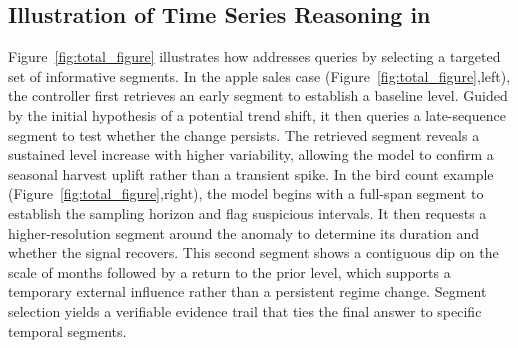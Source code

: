 

\subsection{Illustration of Time Series Reasoning in \algoname}
Figure~\ref{fig:total_figure} illustrates how \algoname addresses queries by selecting a targeted set of informative segments. 
In the apple sales case (Figure~\ref{fig:total_figure},left), the controller first retrieves an early segment to establish a baseline level. Guided by the initial hypothesis of a potential trend shift, it then queries a late-sequence segment to test whether the change persists. The retrieved segment reveals a sustained level increase with higher variability, allowing the model to confirm a seasonal harvest uplift rather than a transient spike. 
In the bird count example (Figure~\ref{fig:total_figure},right), the model begins with a full-span segment to establish the sampling horizon and flag suspicious intervals. It then requests a higher-resolution segment around the anomaly to determine its duration and whether the signal recovers. This second segment shows a contiguous dip on the scale of months followed by a return to the prior level, which supports a temporary external influence rather than a persistent regime change.
%
Segment selection yields a verifiable evidence trail that ties the final answer to specific temporal segments. 